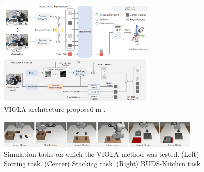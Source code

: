 \begin{figure}[t]
    \centering
    \includegraphics[width=0.7\textwidth]{figures/images/viola/viola_architecture.png}
    \caption{VIOLA architecture proposed in \cite{zhu2023viola}.}
    \label{fig:viola_architecture}
    
\end{figure}

\begin{figure}[t]
    \centering
    \includegraphics[width=0.9\textwidth]{figures/images/viola/viola_task.png}
    \caption{Simulation tasks on which the VIOLA \cite{zhu2023viola} method was tested. (Left) Sorting task. (Center) Stacking task. (Right) BUDS-Kitchen task}
    \label{fig:viola_task}
    
\end{figure}
